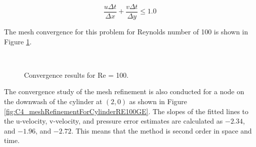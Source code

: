 \begin{equation}\label{eq:C4_CFLnumber}
	\frac{u \Delta t}{\Delta x} + \frac{v \Delta t}{\Delta y} \leq 1.0
\end{equation}

The mesh convergence for this problem for Reynolds number of 100 is shown in Figure \ref{fig:C4_meshConvergenceForCylidnerRE100GE}.

\begin{figure}[H]
    \centering
    \quad
    \\
    \caption{Convergence results for Re = 100.}
    \label{fig:C4_meshConvergenceForCylidnerRE100GE}
\end{figure}

The convergence study of the mesh refinement is also conducted for a node on the downwash of the cylinder at $(2, 0)$ as shown in Figure \ref{fig:C4_meshRefinementForCylinderRE100GE}. The slopes of the fitted lines to the u-velocity, v-velocity, and pressure error estimates are calculated as $-2.34$, and $-1.96$, and $-2.72$. This means that the method is second order in space and time.

